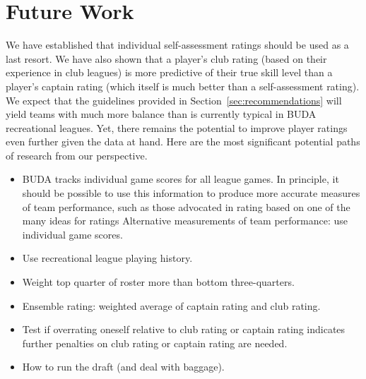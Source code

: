 \section{Future Work}\label{sec:summary}

We have established that individual self-assessment ratings should be used as a last resort. We have also shown that a player's club rating (based on their experience in club leagues) is more predictive of their true skill level than a player's captain rating (which itself is much better than a self-assessment rating). We expect that the guidelines provided in Section~\ref{sec:recommendations} will yield teams with much more balance than is currently typical in BUDA recreational leagues. Yet, there remains the potential to improve player ratings even further given the data at hand. Here are the most significant potential paths of research from our perspective.

\begin{itemize}

\item BUDA tracks individual game scores for all league games. In principle, it should be possible to use this information to produce more accurate measures of team performance, such as those advocated in \cite{Langville_2012}rating based on one of the many ideas for ratings Alternative measurements of team performance: use individual game scores.

\item Use recreational league playing history.

\item Weight top quarter of roster more than bottom three-quarters.

\item Ensemble rating: weighted average of captain rating and club rating.

\item Test if overrating oneself relative to club rating or captain rating indicates further penalties on club rating or captain rating are needed.

\item How to run the draft (and deal with baggage).

\end{itemize}